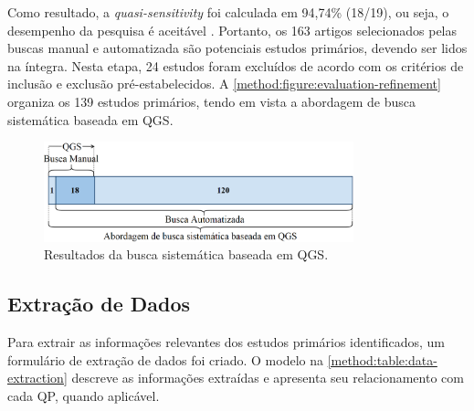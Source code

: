 Como resultado, a \textit{quasi-sensitivity} foi calculada em 94,74\% (18/19), ou seja, o desempenho da pesquisa é aceitável \cite{Zhang2011}. Portanto, os 163 artigos selecionados pelas buscas manual e automatizada são potenciais estudos primários, devendo ser lidos na íntegra. Nesta etapa, 24 estudos foram excluídos de acordo com os critérios de inclusão e exclusão pré-estabelecidos. A \autoref{method:figure:evaluation-refinement} organiza os 139 estudos primários, tendo em vista a abordagem de busca sistemática baseada em QGS.

\begin{figure}[htbp]
\caption{Resultados da busca sistemática baseada em QGS.}
\label{method:figure:evaluation-refinement}
\centerline{\includegraphics[width=0.8\textwidth]{images/systematic-mapping.png}}
\fautor
\end{figure}

\subsection{Extração de Dados}
\label{ms:conducao-extracao-dados}

Para extrair as informações relevantes dos estudos primários identificados, um formulário de extração de dados foi criado. O modelo na \autoref{method:table:data-extraction} descreve as informações extraídas e apresenta seu relacionamento com cada QP, quando aplicável.


